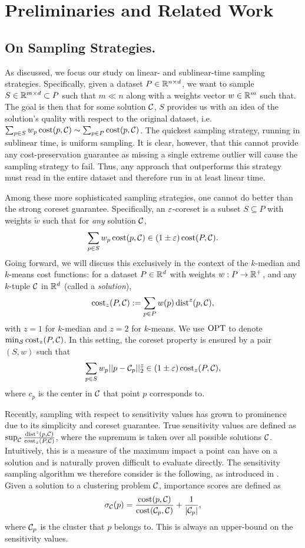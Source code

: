 \section{Preliminaries and Related Work}

\subsection{On Sampling Strategies.}
\label{ssec:sens_sampling}

As discussed, we focus our study on linear- and sublinear-time sampling strategies. Specifically, given a dataset $P \in \mathbb{R}^{n \times d}$, we want to sample $S
\in \mathbb{R}^{m \times d} \subset P$ such that $m \ll n$ along with a weights vector $w \in \mathbb{R}^m$ such that. The goal is then that for some solution $\mathcal C$, $S$
provides us with an idea of the solution's quality with respect to the original dataset, i.e. $\sum_{p \in S} w_p \operatorname{cost}(p, \mathcal C) \sim \sum_{p \in P} \operatorname{cost}(p,
\mathcal C)$. 
The quickest sampling strategy, running in sublinear time, is uniform sampling. It is clear, however, that this cannot provide any cost-preservation guarantee
as missing a single extreme outlier will cause the sampling strategy to fail. Thus, any approach that outperforms this strategy must read in the entire dataset
and therefore run in at least linear time. 

Among these more sophisticated sampling strategies, one cannot do better than the strong coreset guarantee. Specifically, an $\varepsilon$-coreset is a subset $S
\subseteq P$ with weights $\tilde w$ such that for \emph{any} solution $\mathcal C$, \[\sum_{p \in S} w_p \operatorname{cost}(p, \mathcal C) \in (1 \pm \varepsilon) \operatorname{cost}(P, \mathcal C).\] Going
forward, we will discuss this exclusively in the context of the $k$-median and $k$-means cost functions: for a dataset $P \in \mathbb{R}^d$ with weights $w
: P \rightarrow \mathbb{R}^+$, and any $k$-tuple $\mathcal C$ in $\mathbb{R}^d$ (called a \emph{solution}), \[\operatorname{cost}_z(P, \mathcal C) := \sum_{p \in P} w(p) \operatorname{dist}^z(p, \mathcal C),\] with
$z=1$ for $k$-median and $z=2$ for $k$-means. We use $\text{OPT}$ to denote $\min_{\mathcal S} \operatorname{cost}_z(P, \mathcal C)$. In this setting, the coreset property is ensured by
a pair $(S, w)$ such that \[\sum_{p \in S} w_p ||p - \mathcal C_p||_2^z \in (1 \pm \varepsilon) \operatorname{cost}_z(P, \mathcal C),\] where $c_p$ is the center in $\mathcal C$ that point $p$
corresponds to.

Recently, sampling with respect to sensitivity values has grown to prominence due to its simplicity and coreset guarantee.  True sensitivity values are defined
as $\sup_{\mathcal C} \frac{\operatorname{dist}^z(p, \mathcal C)}{\operatorname{cost}_z(P, \mathcal C)}$, where the supremum is taken over all possible solutions $\mathcal C$. Intuitively, this is a measure
of the maximum impact a point can have on a solution and is naturally proven difficult to evaluate directly.
The sensitivity sampling algorithm we therefore consider is the following, as introduced in \cite{FeldmanL11}.
Given a solution to a clustering problem $\mathcal C$, importance scores are defined as
\begin{equation}
\label{eq:sensitivity}
\sigma_\mathcal C(p) = \dfrac{\operatorname{cost}(p, \mathcal C)}{\operatorname{cost}(\mathcal C_{p}, \mathcal C)} + \dfrac{1}{|\mathcal C_p|},
\end{equation}
where $\mathcal C_p$ is the cluster that $p$ belongs to. This is always an upper-bound on the sensitivity values.

